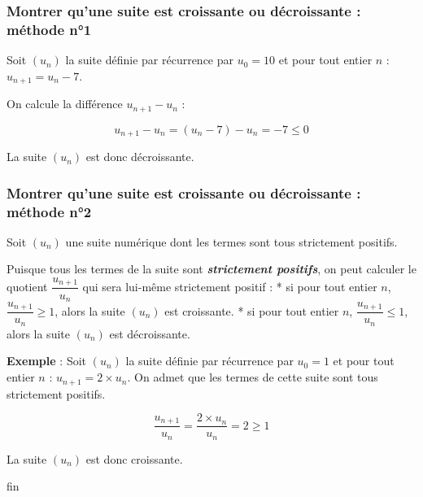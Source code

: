 \documentclass[11pt]{article}
\begin{document}
    \subsubsection{Montrer qu'une suite est croissante ou décroissante :
méthode
n°1}\label{montrer-quune-suite-est-croissante-ou-duxe9croissante-muxe9thode-n1}

Soit \((u_n)\) la suite définie par récurrence par \(u_0=10\) et pour
tout entier \(n\) : \(u_{n+1}=u_n-7\).

    On calcule la différence \(u_{n+1}-u_n\) :

    \[u_{n+1}-u_n=(u_n-7)-u_n=-7\leqslant 0\]

    La suite \((u_n)\) est donc décroissante.

    \subsubsection{Montrer qu'une suite est croissante ou décroissante :
méthode
n°2}\label{montrer-quune-suite-est-croissante-ou-duxe9croissante-muxe9thode-n2}

Soit \((u_n)\) une suite numérique dont les termes sont tous strictement
positifs.

    Puisque tous les termes de la suite sont \textbf{\emph{strictement
positifs}}, on peut calculer le quotient \(\dfrac{u_{n+1}}{u_n}\) qui
sera lui-même strictement positif : * si pour tout entier \(n\),
\(\dfrac{u_{n+1}}{u_n}\geqslant 1\), alors la suite \((u_n)\) est
croissante. * si pour tout entier \(n\),
\(\dfrac{u_{n+1}}{u_n}\leqslant 1\), alors la suite \((u_n)\) est
décroissante.

    \textbf{Exemple} : Soit \((u_n)\) la suite définie par récurrence par
\(u_0=1\) et pour tout entier \(n\) : \(u_{n+1}=2\times u_n\). On admet
que les termes de cette suite sont tous strictement positifs.

    \[\dfrac{u_{n+1}}{u_n}=\dfrac{2\times u_n}{u_n}=2\geqslant 1\]

    La suite \((u_n)\) est donc croissante.

    fin


    
    
    
    
\end{document}
